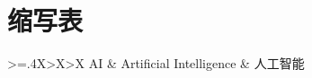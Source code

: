\chapter*{缩写表}

\begin{tabularx}{\linewidth}{{>{\hsize=.4\hsize}X>{\hsize}X>{\hsize}X}}
    AI & Artificial Intelligence & 人工智能 \\
\end{tabularx}
